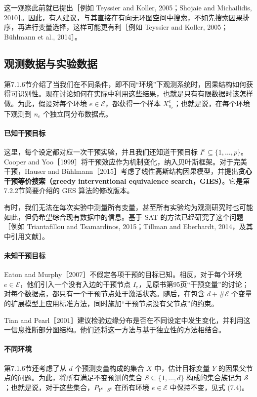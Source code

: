 这一观察此前就已提出［例如 Teyssier and Koller, 2005；Shojaie and Michailidis, 2010］。因此，有人建议，与其直接在有向无环图空间中搜索，不如先搜索因果排序，再进行变量选择，这样可能更有利［例如 Teyssier and Koller, 2005；Bühlmann et al., 2014］。

\subsection{观测数据与实验数据}

第7.1.6节介绍了当我们在不同条件，即不同“环境”下观测系统时，因果结构如何获得可识别性。现在讨论如何在实际中利用这些结果，也就是只有有限数据时该怎样做。为此，假设对每个环境 $e\in\mathcal E$，都获得一个样本 $X^e_{n_e}$；也就是说，在每个环境下观测到 $n_e$ 个独立同分布数据点。

\paragraph{已知干预目标}
这里，每个设定都对应一次干预实验，并且我们还知道干预目标 $I^e\subseteq\{1,\ldots,p\}$。Cooper and Yoo［1999］将干预效应作为机制变化，纳入贝叶斯框架。对于完美干预，Hauser and Bühlmann［2015］考虑了线性高斯结构因果模型，并提出\textbf{贪心干预等价搜索（greedy interventional equivalence search，GIES）}。它是第7.2.2节简要介绍的 GES 算法的修改版本。

有时，我们无法在每次实验中测量所有变量，甚至所有实验均为观测研究时也可能如此，但仍希望综合现有数据中的信息。基于 SAT 的方法已经研究了这个问题［例如 Triantafillou and Tsamardinos, 2015；Tillman and Eberhardt, 2014，及其中引用文献］。

\paragraph{未知干预目标}
Eaton and Murphy［2007］不假定各项干预的目标已知。相反，对于每个环境 $e\in\mathcal E$，他们引入一个没有入边的干预节点 $I_e$，见原书第95页“干预变量”的讨论；对每个数据点，都只有一个干预节点处于激活状态。随后，在包含 $d+\#\mathcal E$ 个变量的扩展模型上应用标准方法，同时施加“干预节点没有父节点”的约束。

Tian and Pearl［2001］建议检验边缘分布是否在不同设定中发生变化，并利用这一信息推断部分图结构。他们还将这一方法与基于独立性的方法相结合。

\paragraph{不同环境}
第7.1.6节还考虑了从 $d$ 个预测变量构成的集合 $X$ 中，估计目标变量 $Y$ 的因果父节点的问题。为此，将所有满足不变预测的集合 $S\subseteq\{1,\ldots,d\}$ 构成的集合族记为 $\mathcal S$；也就是说，对于这些集合，$P_{Y^e\mid S^e}$ 在所有环境 $e\in\mathcal E$ 中保持不变，见式 (7.4)。

